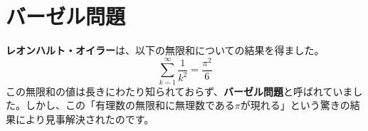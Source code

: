 \documentclass{ltjsarticle}
\begin{document}
\section{バーゼル問題}
\textbf{レオンハルト・オイラー}は、以下の無限和についての結果を得ました。
\[ \sum_{k=1}^{\infty} \frac{1}{k^2} = \frac{\pi^2}{6} \]
この無限和の値は長きにわたり知られておらず、\textbf{バーゼル問題}と呼ばれていました。しかし、この「有理数の無限和に無理数である$\pi$が現れる」という驚きの結果により見事解決されたのです。
\end{document}
